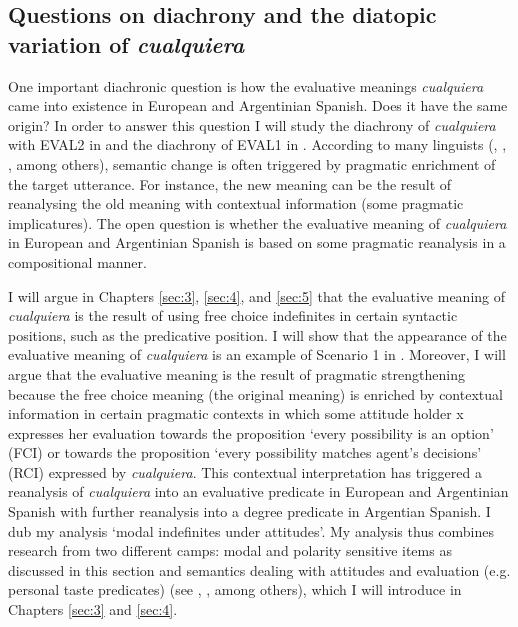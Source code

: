 \subsection{{Questions} {on} {diachrony} {and} {the} {diatopic} {variation} {of} {\textit{cualquiera}}} \label{sec:2.7.2}

One important diachronic question is how the evaluative meanings \textit{cualquiera} came into existence in European and Argentinian Spanish. Does it have the same origin? In order to answer this question I will study the diachrony of \textit{cualquiera} with EVAL2 in  and the diachrony of EVAL1 in . According to many linguists (\citealt{Blank1997}, \citealt{Traugott1989}, \citealt{Eckardt2006}, among others), semantic change is often triggered by pragmatic enrichment of the target utterance. For instance, the new meaning can be the result of reanalysing the old meaning with contextual information (some pragmatic implicatures). The open question is whether the evaluative meaning of \textit{cualquiera} in European and Argentinian Spanish is based on some pragmatic reanalysis in a compositional manner.

I will argue in Chapters \ref{sec:3}, \ref{sec:4}, and \ref{sec:5} that the evaluative meaning of \textit{cualquiera} is the result of using free choice indefinites in certain syntactic positions, such as the predicative position. I will show that the appearance of the evaluative meaning of \textit{cualquiera} is an example of Scenario 1 in . Moreover, I will argue that the evaluative meaning is the result of pragmatic strengthening because the free choice meaning (the original meaning) is enriched by contextual information in certain pragmatic contexts in which some attitude holder x expresses her evaluation towards the proposition ‘every possibility is an option’ (FCI) or towards the proposition ‘every possibility matches agent’s decisions’ (RCI) expressed by \textit{cualquiera}. This contextual interpretation has triggered a reanalysis of \textit{cualquiera} into an evaluative predicate in European and Argentinian Spanish with further reanalysis into a degree predicate in Argentian Spanish. I dub my analysis ‘modal indefinites under attitudes’. My analysis thus combines research from two different camps: modal and polarity sensitive items as discussed in this section and semantics dealing with attitudes and evaluation (e.g. personal taste predicates) (see \citealt{Heim1982}, \citealt{Lasersohn2005}, among others), which I will introduce in Chapters \ref{sec:3} and \ref{sec:4}.
